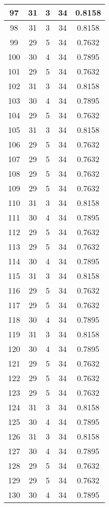 \documentclass[letterpaper, 12pt]{article}
\begin{document}
\begin{longtable}{|c|c|c|c|c|}
\hline
97 & 31 & 3 & 34 & 0.8158 \\
\hline
98 & 31 & 3 & 34 & 0.8158 \\
\hline
99 & 29 & 5 & 34 & 0.7632 \\
\hline
100 & 30 & 4 & 34 & 0.7895 \\
\hline
101 & 29 & 5 & 34 & 0.7632 \\
\hline
102 & 31 & 3 & 34 & 0.8158 \\
\hline
103 & 30 & 4 & 34 & 0.7895 \\
\hline
104 & 29 & 5 & 34 & 0.7632 \\
\hline
105 & 31 & 3 & 34 & 0.8158 \\
\hline
106 & 29 & 5 & 34 & 0.7632 \\
\hline
107 & 29 & 5 & 34 & 0.7632 \\
\hline
108 & 29 & 5 & 34 & 0.7632 \\
\hline
109 & 29 & 5 & 34 & 0.7632 \\
\hline
110 & 31 & 3 & 34 & 0.8158 \\
\hline
111 & 30 & 4 & 34 & 0.7895 \\
\hline
112 & 29 & 5 & 34 & 0.7632 \\
\hline
113 & 29 & 5 & 34 & 0.7632 \\
\hline
114 & 30 & 4 & 34 & 0.7895 \\
\hline
115 & 31 & 3 & 34 & 0.8158 \\
\hline
116 & 29 & 5 & 34 & 0.7632 \\
\hline
117 & 29 & 5 & 34 & 0.7632 \\
\hline
118 & 30 & 4 & 34 & 0.7895 \\
\hline
119 & 31 & 3 & 34 & 0.8158 \\
\hline
120 & 30 & 4 & 34 & 0.7895 \\
\hline
121 & 29 & 5 & 34 & 0.7632 \\
\hline
122 & 29 & 5 & 34 & 0.7632 \\
\hline
123 & 29 & 5 & 34 & 0.7632 \\
\hline
124 & 31 & 3 & 34 & 0.8158 \\
\hline
125 & 30 & 4 & 34 & 0.7895 \\
\hline
126 & 31 & 3 & 34 & 0.8158 \\
\hline
127 & 30 & 4 & 34 & 0.7895 \\
\hline
128 & 29 & 5 & 34 & 0.7632 \\
\hline
129 & 29 & 5 & 34 & 0.7632 \\
\hline
130 & 30 & 4 & 34 & 0.7895 \\

\end{longtable}
\end{document}
